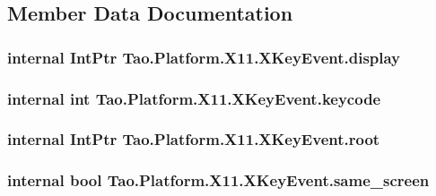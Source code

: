 \subsection{Member Data Documentation}
\hypertarget{struct_tao_1_1_platform_1_1_x11_1_1_x_key_event_a72b72d7ae15a51e66962ec26fe705810}{
\subsubsection[{display}]{\setlength{\rightskip}{0pt plus 5cm}internal IntPtr {\bf Tao.Platform.X11.XKeyEvent.display}}}
\label{struct_tao_1_1_platform_1_1_x11_1_1_x_key_event_a72b72d7ae15a51e66962ec26fe705810}
\hypertarget{struct_tao_1_1_platform_1_1_x11_1_1_x_key_event_a4ba2d316452aa2cab0c117ff23ea0ccd}{
\subsubsection[{keycode}]{\setlength{\rightskip}{0pt plus 5cm}internal int {\bf Tao.Platform.X11.XKeyEvent.keycode}}}
\label{struct_tao_1_1_platform_1_1_x11_1_1_x_key_event_a4ba2d316452aa2cab0c117ff23ea0ccd}
\hypertarget{struct_tao_1_1_platform_1_1_x11_1_1_x_key_event_abc0efe8decfe9d296aa4f9edae8d213a}{
\subsubsection[{root}]{\setlength{\rightskip}{0pt plus 5cm}internal IntPtr {\bf Tao.Platform.X11.XKeyEvent.root}}}
\label{struct_tao_1_1_platform_1_1_x11_1_1_x_key_event_abc0efe8decfe9d296aa4f9edae8d213a}
\hypertarget{struct_tao_1_1_platform_1_1_x11_1_1_x_key_event_a0d5b9ebbb8043cb7f970d795f32fa61f}{
\subsubsection[{same\_\-screen}]{\setlength{\rightskip}{0pt plus 5cm}internal bool {\bf Tao.Platform.X11.XKeyEvent.same\_\-screen}}}
